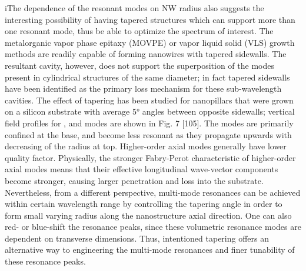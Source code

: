 iThe dependence of the resonant modes on NW radius also suggests the
interesting possibility of having tapered structures which can support more
than one resonant mode, thus be able to optimize the spectrum of interest.  The
metalorganic vapor phase epitaxy (MOVPE) or vapor liquid solid (VLS) growth
methods are readily capable of forming nanowires with tapered sidewalls. The
resultant cavity, however, does not support the superposition of the modes
present in cylindrical structures of the same diameter; in fact tapered
sidewalls have been identified as the primary loss mechanism for these
sub-wavelength cavities.  The effect of  tapering has been studied for
nanopillars that were grown on a silicon substrate with average 5° angles
between opposite sidewalls; vertical field profiles for ,  and  modes are shown
in Fig. 7 [105]. The modes are primarily confined at the base, and become less
resonant as they propagate upwards with decreasing of the radius at top.
Higher-order axial modes generally have lower quality factor. Physically, the
stronger Fabry-Perot characteristic of higher-order axial modes means that
their effective longitudinal wave-vector components become stronger, causing
larger penetration and loss into the substrate. Nevertheless, from a different
perspective, multi-mode resonances can be achieved within certain wavelength
range by controlling the tapering angle in order to form small varying radius
along the nanostructure axial direction. One can also red- or blue-shift the
resonance peaks, since these volumetric resonance modes are dependent on
transverse dimensions. Thus, intentioned tapering offers an alternative way to
engineering the multi-mode resonances and finer tunability of these resonance
peaks.




